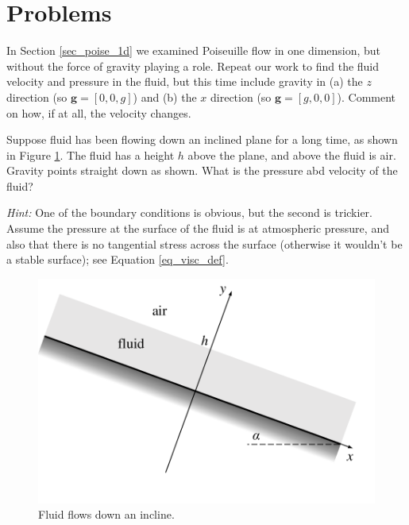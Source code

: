 \section*{Problems}


\begin{problem}
\label{prob_poise_grav}
In Section \ref{sec_poise_1d} we examined Poiseuille flow in one dimension, but without the force of gravity playing a role.  Repeat our work to find the fluid velocity and pressure in the fluid, but this time include gravity in (a) the $z$ direction (so $\mathbf{g} = [0,0,g]$) and (b) the $x$ direction (so $\mathbf{g} = [g, 0, 0]$).  Comment on how, if at all, the velocity changes.
\end{problem}

\begin{problem}
Suppose fluid has been flowing down an inclined plane for a long time, as shown in Figure \ref{fig_incline_setup}.  The fluid has a height $h$ above the plane, and above the fluid is air.  Gravity points straight down as shown.  What is the pressure abd velocity of the fluid?  

\emph{Hint:} One of the boundary conditions is obvious, but the second is trickier.  Assume the pressure at the surface of the fluid is at atmospheric pressure, and also that there is no tangential stress across the surface (otherwise it wouldn't be a stable surface); see Equation \ref{eq_visc_def}.
\end{problem}

\begin{figure}
\centering
\includegraphics[width=0.7\linewidth]{Figures/Chapter2/fig_incline_setup}
\caption{Fluid flows down an incline.}
\label{fig_incline_setup}
\end{figure}

